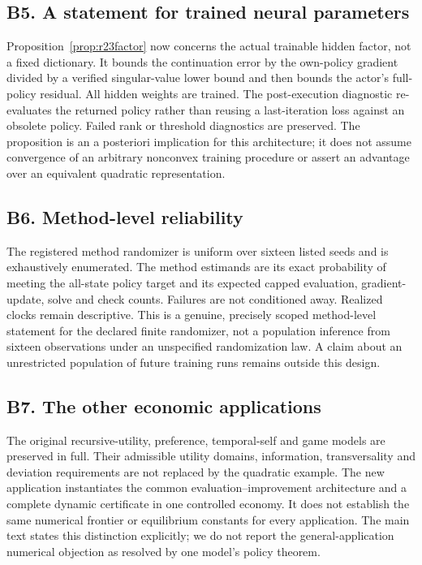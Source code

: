 \subsection*{B5. A statement for trained neural parameters}
Proposition~\ref{prop:r23factor} now concerns the actual trainable hidden
factor, not a fixed dictionary. It bounds the continuation error by the
own-policy gradient divided by a verified singular-value lower bound and
then bounds the actor's full-policy residual. All hidden weights are trained.
The post-execution diagnostic re-evaluates the returned policy rather than
reusing a last-iteration loss against an obsolete policy. Failed rank or
threshold diagnostics are preserved. The proposition is an a posteriori
implication for this architecture; it does not assume convergence of an
arbitrary nonconvex training procedure or assert an advantage over an
equivalent quadratic representation.

\subsection*{B6. Method-level reliability}
The registered method randomizer is uniform over sixteen listed seeds and
is exhaustively enumerated. The method estimands are its exact probability
of meeting the all-state policy target and its expected capped evaluation,
gradient-update, solve and check counts. Failures are not conditioned away.
Realized clocks remain descriptive. This is a genuine, precisely scoped
method-level statement for the declared finite randomizer, not a population
inference from sixteen observations under an unspecified randomization law.
A claim about an unrestricted population of future training runs remains
outside this design.

\subsection*{B7. The other economic applications}
The original recursive-utility, preference, temporal-self and game models
are preserved in full. Their admissible utility domains, information,
transversality and deviation requirements are not replaced by the quadratic
example. The new application instantiates the common evaluation--improvement
architecture and a complete dynamic certificate in one controlled economy.
It does not establish the same numerical frontier or equilibrium constants
for every application. The main text states this distinction explicitly;
we do not report the general-application numerical objection as resolved by
one model's policy theorem.

